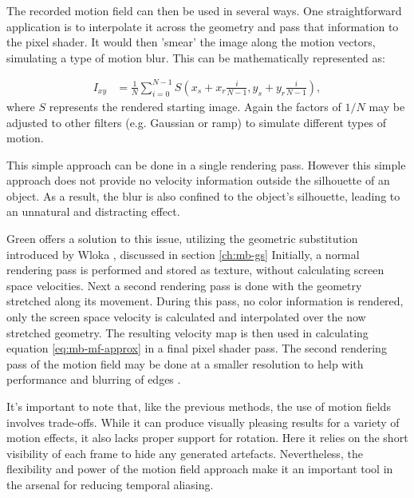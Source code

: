 The recorded motion field can then be used in several ways.
One straightforward application is to interpolate it across the geometry and pass that information to the pixel shader.
It would then 'smear' the image along the motion vectors, simulating a type of motion blur.
This can be mathematically represented as:

\begin{align}
    I_{xy} &= \frac{1}{N} \sum_{i=0}^{N-1}  S(x_s + x_r \frac{i}{N-1}, y_s + y_r \frac{i}{N-1}),
    \label{eq:mb-mf-approx}
\end{align}
where $S$ represents the rendered starting image.
Again the factors of $1/N$ may be adjusted to other filters (e.g. Gaussian or ramp) to simulate different types of motion.

This simple approach can be done in a single rendering pass.
However this simple approach does not provide no velocity information outside the silhouette of an object.
As a result, the blur is also confined to the object's silhouette, leading to an unnatural and distracting effect.

Green \cite{Green.2003} offers a solution to this issue, utilizing the geometric substitution introduced by Wloka \cite{Wloka.1996}, discussed in section \ref{ch:mb-gs}
Initially, a normal rendering pass is performed and stored as texture, without calculating screen space velocities.
Next a second rendering pass is done with the geometry stretched along its movement.
During this pass, no color information is rendered, only the screen space velocity is calculated and interpolated over the now stretched geometry.
The resulting velocity map is then used in calculating equation \ref{eq:mb-mf-approx} in a final pixel shader pass.
The second rendering pass of the motion field may be done at a smaller resolution to help with performance and blurring of edges \cite{Sousa.2008}.

It's important to note that, like the previous methods, the use of motion fields involves trade-offs. 
While it can produce visually pleasing results for a variety of motion effects, it also lacks proper support for rotation.
Here it relies on the short visibility of each frame to hide any generated artefacts.
Nevertheless, the flexibility and power of the motion field approach make it an important tool in the arsenal for reducing temporal aliasing.